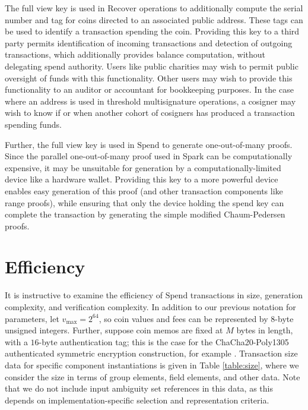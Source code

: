 \documentclass{llncs}
\begin{document}
The full view key is used in $\text{Recover}$ operations to additionally compute the serial number and tag for coins directed to an associated public address.
These tags can be used to identify a transaction spending the coin.
Providing this key to a third party permits identification of incoming transactions and detection of outgoing transactions, which additionally provides balance computation, without delegating spend authority.
Users like public charities may wish to permit public oversight of funds with this functionality.
Other users may wish to provide this functionality to an auditor or accountant for bookkeeping purposes.
In the case where an address is used in threshold multisignature operations, a cosigner may wish to know if or when another cohort of cosigners has produced a transaction spending funds.

Further, the full view key is used in $\text{Spend}$ to generate one-out-of-many proofs.
Since the parallel one-out-of-many proof used in Spark can be computationally expensive, it may be unsuitable for generation by a computationally-limited device like a hardware wallet.
Providing this key to a more powerful device enables easy generation of this proof (and other transaction components like range proofs), while ensuring that only the device holding the spend key can complete the transaction by generating the simple modified Chaum-Pedersen proofs.


\section{Efficiency}

It is instructive to examine the efficiency of $\text{Spend}$ transactions in size, generation complexity, and verification complexity.
In addition to our previous notation for parameters, let $v_{\text{max}} = 2^{64}$, so coin values and fees can be represented by $8$-byte unsigned integers.
Further, suppose coin memos are fixed at $M$ bytes in length, with a $16$-byte authentication tag; this is the case for the ChaCha20-Poly1305 authenticated symmetric encryption construction, for example \cite{chachapoly}.
Transaction size data for specific component instantiations is given in Table \ref{table:size}, where we consider the size in terms of group elements, field elements, and other data.
Note that we do not include input ambiguity set references in this data, as this depends on implementation-specific selection and representation criteria.
\end{document}
